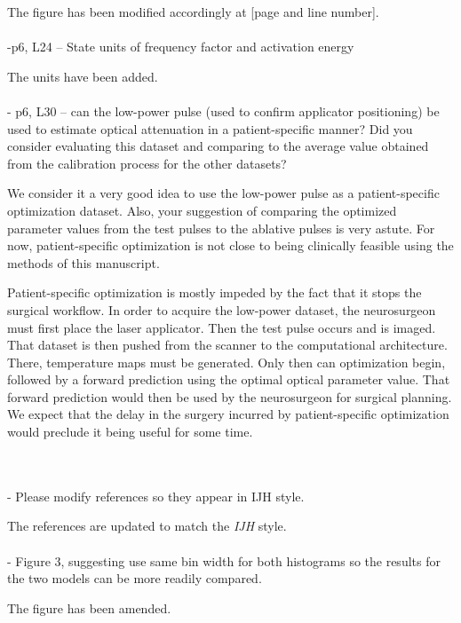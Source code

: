 \documentclass[letterpaper,12pt]{report}
\begin{document}
{\color{red}
The figure has been modified accordingly at
{\color{green}[page and line number]}. 
}\\
\\
-p6, L24 -- State units of frequency factor and activation energy

{\color{red}
The units have been added.
}\\
\\
- p6, L30 -- can the low-power pulse (used to confirm applicator positioning) be used to estimate optical
attenuation in a patient-specific manner? Did you consider evaluating this dataset and comparing to the
average value obtained from the calibration process for the other datasets?

{\color{red}
We consider it a very good idea to use the low-power pulse as a patient-specific optimization dataset. Also,
your suggestion of comparing the optimized parameter values from the test pulses to the ablative pulses is
very astute. For now, patient-specific optimization is not close to being clinically feasible using the
methods of this manuscript.

Patient-specific optimization is mostly impeded by the fact that it stops the surgical workflow. In order to
acquire the low-power dataset, the neurosurgeon must first place the laser applicator. Then the test pulse
occurs and is imaged. That dataset is then pushed from the scanner to the computational architecture. There,
temperature maps must be generated. Only then can optimization begin, followed by a forward prediction
using the optimal optical parameter value. That forward prediction would then be used by the neurosurgeon for
surgical planning. We expect that the delay in the surgery incurred by patient-specific optimization would
preclude it being useful for some time. 
}\\
\\
- Please modify references so they appear in IJH style.

{\color{red}
The references are updated to match the \textit{IJH} style.
}\\
\\
- Figure 3, suggesting use same bin width for both histograms so the results for the two models can be
more readily compared.

{\color{red}
The figure has been amended.
}
\end{document}
